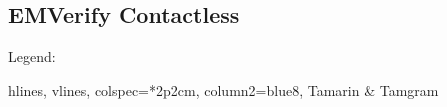 \documentclass[10pt,a4paper]{article}
\begin{document}
	\setlength{\parindent}{0pt}
	
	\begin{landscape}
		
		\section{EMVerify Contactless}
    
    Legend:
    \begin{tblr}{
        hlines,
        vlines,
        colspec={*{2}{p{2cm}}},
        column{2}={blue8},
      }
      Tamarin & Tamgram
    \end{tblr}
    
    
    
    \pagebreak
    
    
    \pagebreak
    
    
    \pagebreak
    
    
    \pagebreak
    
		
	\end{landscape}
	
\end{document}
